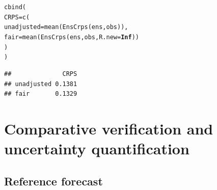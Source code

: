 \documentclass[article]{jss}\usepackage[]{graphicx}\usepackage[]{color}
\makeatletter
\newcommand{\hlnum}[1]{\textcolor[rgb]{0.502,0,0.502}{\textbf{#1}}}%
\newcommand{\hlstd}[1]{\textcolor[rgb]{0,0,0}{#1}}%
\newcommand{\hlkwc}[1]{\textcolor[rgb]{0,0.502,0.753}{#1}}%
\newcommand{\hlkwd}[1]{\textcolor[rgb]{0,0.267,0.4}{#1}}%
\newenvironment{kframe}{%
 \def\at@end@of@kframe{}%
 \ifinner\ifhmode%
  \def\at@end@of@kframe{\end{minipage}}%
  \begin{minipage}{\columnwidth}%
 \fi\fi%
 \def\FrameCommand##1{\hskip\@totalleftmargin \hskip-\fboxsep
 \colorbox{shadecolor}{##1}\hskip-\fboxsep
     \hskip-\linewidth \hskip-\@totalleftmargin \hskip\columnwidth}%
 \MakeFramed {\advance\hsize-\width
   \@totalleftmargin\z@ \linewidth\hsize
   \@setminipage}}%
 {\par\unskip\endMakeFramed%
 \at@end@of@kframe}
\newenvironment{knitrout}{}{} %
\makeatother
\begin{document}
\begin{knitrout}
\color{fgcolor}\begin{kframe}
\begin{alltt}
\hlkwd{cbind}\hlstd{(}
 \hlkwc{CRPS}\hlstd{=}\hlkwd{c}\hlstd{(}
  \hlkwc{unadjusted} \hlstd{=} \hlkwd{mean}\hlstd{(}\hlkwd{EnsCrps}\hlstd{(ens, obs)),}
  \hlkwc{fair}       \hlstd{=} \hlkwd{mean}\hlstd{(}\hlkwd{EnsCrps}\hlstd{(ens, obs,} \hlkwc{R.new}\hlstd{=}\hlnum{Inf}\hlstd{))}
 \hlstd{)}
\hlstd{)}
\end{alltt}
\begin{verbatim}
##              CRPS
## unadjusted 0.1381
## fair       0.1329
\end{verbatim}
\end{kframe}
\end{knitrout}



\section{Comparative verification and uncertainty quantification}


\subsection{Reference forecast}
\end{document}
